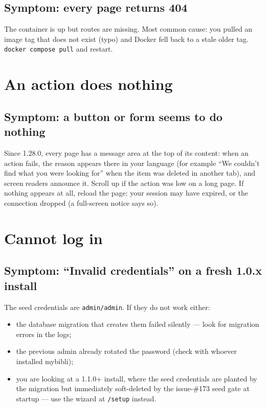 \subsection*{Symptom: every page returns 404}

The container is up but routes are missing. Most common cause:
you pulled an image tag that does not exist (typo) and Docker
fell back to a stale older tag. \texttt{docker compose pull} and
restart.

\section{An action does nothing}\label{sec:troubleshoot-action-silent}

\subsection*{Symptom: a button or form seems to do nothing}

Since 1.28.0, every page has a message area at the top of its
content: when an action fails, the reason appears there in your
language (for example ``We couldn't find what you were looking for''
when the item was deleted in another tab), and screen readers announce
it. Scroll up if the action was low on a long page. If nothing appears
at all, reload the page: your session may have expired, or the
connection dropped (a full-screen notice says so).

\section{Cannot log in}

\subsection*{Symptom: ``Invalid credentials'' on a fresh 1.0.x install}

The seed credentials are \texttt{admin/admin}. If they do not work
either:

\begin{itemize}
  \item the database migration that creates them failed silently
        — look for migration errors in the logs;
  \item the previous admin already rotated the password (check
        with whoever installed mybibli);
  \item you are looking at a 1.1.0+ install, where the seed
        credentials are planted by the migration but immediately
        soft-deleted by the issue-\#173 seed gate at startup — use
        the wizard at \texttt{/setup} instead.
\end{itemize}

